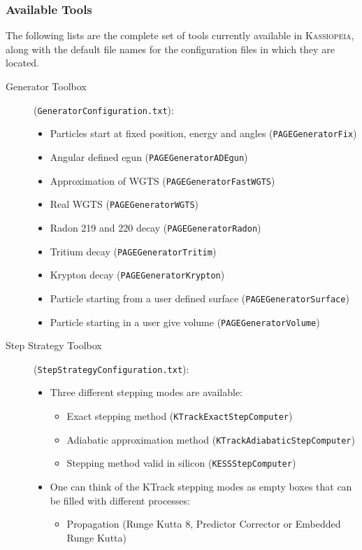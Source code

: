 \subsubsection{Available Tools}
The following lists are the complete set of tools currently available in \textsc{Kassiopeia}, along with the default file names for the configuration files in which they are located.
\begin{description}
	\item[Generator Toolbox] (\texttt{GeneratorConfiguration.txt}):
	\begin{itemize}
		\item Particles start at fixed position, energy and angles (\texttt{PAGEGeneratorFix})
		\item Angular defined egun (\texttt{PAGEGeneratorADEgun})
		\item Approximation of WGTS (\texttt{PAGEGeneratorFastWGTS})
		\item Real WGTS (\texttt{PAGEGeneratorWGTS})
		\item Radon 219 and 220 decay (\texttt{PAGEGeneratorRadon})
		\item Tritium decay (\texttt{PAGEGeneratorTritim})
		\item Krypton decay (\texttt{PAGEGeneratorKrypton})
		\item Particle starting from a user defined surface (\texttt{PAGEGeneratorSurface})
		\item Particle starting in a user give volume (\texttt{PAGEGeneratorVolume})
	\end{itemize}
	\item[Step Strategy Toolbox] (\texttt{StepStrategyConfiguration.txt}):
	\begin{itemize}
		\item Three different stepping modes are available:
		\begin{itemize}
			\item Exact stepping method (\texttt{KTrackExactStepComputer})
			\item Adiabatic approximation method (\texttt{KTrackAdiabaticStepComputer})
			\item Stepping method valid in silicon (\texttt{KESSStepComputer})
		\end{itemize}
		\item One can think of the KTrack stepping modes as empty boxes that can be filled with different processes:
		\begin{itemize}
			\item Propagation (Runge Kutta 8, Predictor Corrector or Embedded Runge Kutta)

\end{itemize}
\end{itemize}
\end{description}
